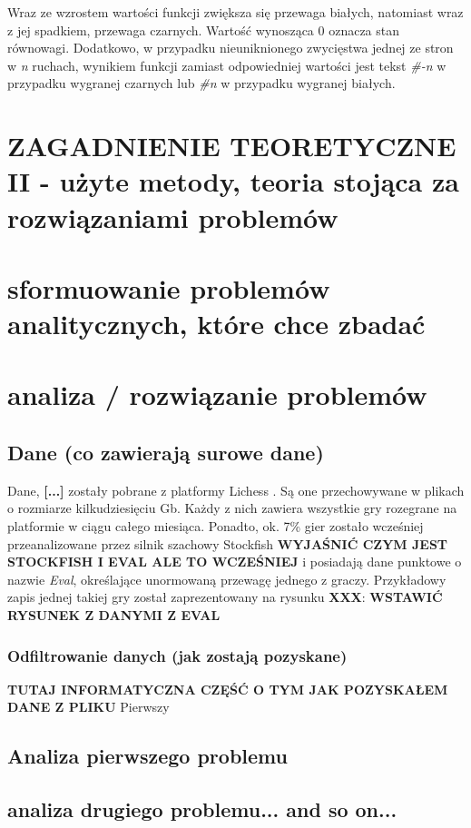 \documentclass[inzynierska]{pwr_wmat_praca_dyplomowa}
\theoremstyle{plain}
\numberwithin{theorem}{chapter}
\theoremstyle{definition}
\numberwithin{theorem}{chapter}
\begin{document}
Wraz ze wzrostem wartości funkcji zwiększa się przewaga białych, natomiast wraz z jej spadkiem, przewaga czarnych. Wartość wynosząca 0 oznacza stan równowagi. Dodatkowo, w przypadku nieuniknionego zwycięstwa jednej ze stron w \textit{n} ruchach, wynikiem funkcji zamiast odpowiedniej wartości jest tekst \textit{\#-n} w przypadku wygranej czarnych lub \textit{\#n} w przypadku wygranej białych.



\chapter{ZAGADNIENIE TEORETYCZNE II - użyte metody, teoria stojąca za rozwiązaniami problemów}
\chapter{sformuowanie problemów analitycznych, które chce zbadać}
\chapter{analiza / rozwiązanie problemów}
\section{Dane (co zawierają surowe dane)}
Dane, \textbf{[...]} zostały pobrane z platformy Lichess \cite{lichess}. Są one przechowywane w plikach o rozmiarze kilkudziesięciu Gb. Każdy z nich zawiera wszystkie gry rozegrane na platformie w ciągu całego miesiąca. Ponadto, ok. 7\% gier zostało wcześniej przeanalizowane przez silnik szachowy Stockfish \textbf{WYJAŚNIĆ CZYM JEST STOCKFISH I EVAL ALE TO WCZEŚNIEJ} i posiadają dane punktowe o nazwie \textit{Eval}, określające unormowaną przewagę jednego z graczy. Przykładowy zapis jednej takiej gry został zaprezentowany na rysunku \textbf{XXX}:
\textbf{WSTAWIĆ RYSUNEK Z DANYMI Z EVAL}
\subsection{Odfiltrowanie danych (jak zostają pozyskane)}
\textbf{TUTAJ INFORMATYCZNA CZĘŚĆ O TYM JAK POZYSKAŁEM DANE Z PLIKU}
Pierwszy
\section{Analiza pierwszego problemu}
\section{analiza drugiego problemu...  and so on...}
\end{document}
